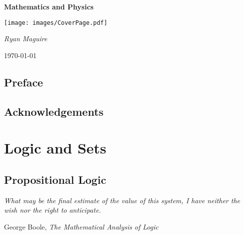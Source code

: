 \documentclass{book}                                                           %
\begin{document}
    \pagecolor{CoverPage}
    \begin{titlepage}
        \centering
        \LARGE{\bfseries{Mathematics and Physics}}
        \par\vspace{3.5cm}
        \texttt{[image: images/CoverPage.pdf]}
        \par\vspace{4cm}
        \Large{\itshape{Ryan Maguire}}
        \par\vspace{1.5ex}
        \normalsize{\today}
    \end{titlepage}
    \nopagecolor
    \tableofcontents
    \listoffigures
    \listoftables
    \clearpage
    \chapter*{Preface}
        
    \clearpage
    \chapter*{Acknowledgements}
        
    \clearpage
        \renewcommand{\TOPPATH}{books/Foundations}
        \label{book:Foundations}%
        \renewcommand{\PARPATH}{\TOPPATH/Logic_and_Sets}
        \part{Logic and Sets}
            \chapter{Propositional Logic}
                \hfill
                \begin{minipage}[b]{0.7\textwidth}
                    \itshape
                    What may be the final estimate of the value of this
                    system, I have neither the wish nor the right to
                    anticipate.
                    \par\hfill\par
                    \hfill
                    \normalfont
                    George Boole,
                    \itshape
                    The Mathematical Analysis of Logic
                \end{minipage}
                \par\hfill\par
                \renewcommand{\PATH}{\PARPATH/Propositional_Logic}
                \label{chapt:Propositional_Logic}%
                
                
\end{document}
